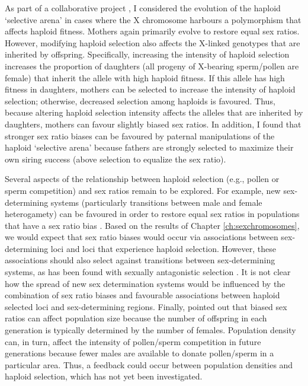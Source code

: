 \documentclass[12pt]{article}
\begin{document}
{As part of a collaborative project \citep{Otto:2015va}, I considered the evolution of the haploid `selective arena' in cases where the X chromosome harbours a polymorphism that affects haploid fitness. 
Mothers again primarily evolve to restore equal sex ratios.
However, modifying haploid selection also affects the X-linked genotypes that are inherited by offspring. 
Specifically, increasing the intensity of haploid selection increases the proportion of daughters (all progeny of X-bearing sperm/pollen are female) that inherit the allele with high haploid fitness. 
If this allele has high fitness in daughters, mothers can be selected to increase the intensity of haploid selection; otherwise, decreased selection among haploids is favoured.
Thus, because altering haploid selection intensity affects the alleles that are inherited by daughters, mothers can favour slightly biased sex ratios. 
In addition, I found that stronger sex ratio biases can be favoured by paternal manipulations of the haploid `selective arena' because fathers are strongly selected to maximize their own siring success (above selection to equalize the sex ratio).

Several aspects of the relationship between haploid selection (e.g., pollen or sperm competition) and sex ratios remain to be explored. 
For example, new sex-determining systems (particularly transitions between male and female heterogamety) can be favoured in order to restore equal sex ratios in populations that have a sex ratio bias \citep{Bull:1983vi,Kozielska:2010vm,Ubeda:2015fx}.
Based on the results of Chapter \ref{ch:sexchromosomes}, we would expect that sex ratio biases would occur via associations between sex-determining loci and loci that experience haploid selection. 
However, these associations should also select against transitions between sex-determining systems, as has been found with sexually antagonistic selection \citep{vanDoorn:2007eu,vanDoorn:2010hu}. 
It is not clear how the spread of new sex determination systems would be influenced by the combination of sex ratio biases and favourable associations between haploid selected loci and sex-determining regions. 
Finally, \citet{Hamilton:1967ts} pointed out that biased sex ratios can affect population size because the number of offspring in each generation is typically determined by the number of females. 
Population density can, in turn, affect the intensity of pollen/sperm competition in future generations because fewer males are available to donate pollen/sperm in a particular area. 
Thus, a feedback could occur between population densities and haploid selection, which has not yet been investigated. 
}






\end{document}
